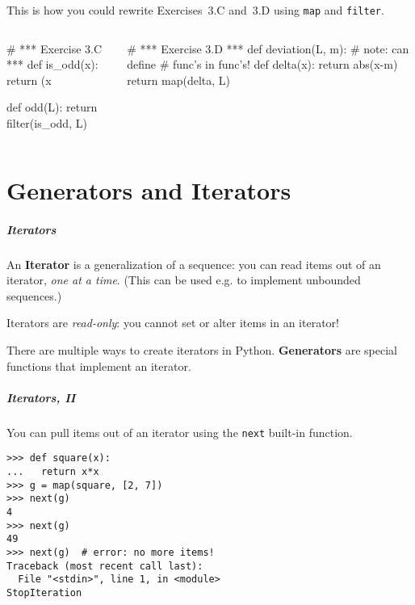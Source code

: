 \documentclass[english,serif,mathserif,xcolor=pdftex,dvipsnames,table]{beamer}
\begin{document}
\begin{frame}[fragile]
  This is how you could rewrite Exercises~3.C and~3.D using \texttt{map} and
  \texttt{filter}.

  \begin{columns}
    \begin{column}{0.5\linewidth}
\begin{python}
# *** Exercise 3.C ***
def is_odd(x):
  return (x %

def odd(L):
  return filter(is_odd, L)
\end{python}
\end{column}
\begin{column}{0.5\linewidth}
\begin{python}
# *** Exercise 3.D ***
def deviation(L, m):
  # note: can define
  # func's in func's!
  def delta(x):
    return abs(x-m)
  return map(delta, L)
\end{python}
\end{column}
\end{columns}
\end{frame}


\part{Generators and Iterators}
\begin{frame}
  \frametitle{Iterators}

  An \textbf{Iterator} is a generalization of a sequence: you can read
  items out of an iterator, \emph{one at a time}. (This can be used
  e.g. to implement unbounded sequences.)

  \+
  Iterators are \emph{read-only}:
  you cannot set or alter items in an iterator!


  \+
  There are multiple ways to create iterators in
  Python. \textbf{Generators} are special functions that implement an
  iterator.
\end{frame}


\begin{frame}[fragile]
  \frametitle{Iterators, II}

  You can pull items out of an iterator using the \lstinline|next|
  built-in function.

  \+
\begin{lstlisting}
>>> def square(x):
...   return x*x
>>> g = map(square, [2, 7])
>>> next(g)
4
>>> next(g)
49
>>> next(g)  # error: no more items!
Traceback (most recent call last):
  File "<stdin>", line 1, in <module>
StopIteration
\end{lstlisting}
\end{frame}
\end{document}
